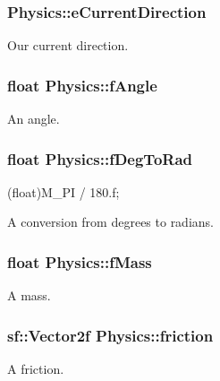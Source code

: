 \subsubsection[{\texorpdfstring{e\+Current\+Direction}{eCurrentDirection}}]{ Physics\+::e\+Current\+Direction}\hypertarget{class_physics_ab58bbe849c871adc33364138e6777971}{}\label{class_physics_ab58bbe849c871adc33364138e6777971}
Our current direction. 
\subsubsection[{\texorpdfstring{f\+Angle}{fAngle}}]{\setlength{\rightskip}{0pt plus 5cm}float Physics\+::f\+Angle\hspace{0.3cm}{\ttfamily [private]}}\hypertarget{class_physics_a80e4f969bbf284b0ace8261527e4b232}{}\label{class_physics_a80e4f969bbf284b0ace8261527e4b232}
An angle. 
\subsubsection[{\texorpdfstring{f\+Deg\+To\+Rad}{fDegToRad}}]{\setlength{\rightskip}{0pt plus 5cm}float Physics\+::f\+Deg\+To\+Rad\hspace{0.3cm}{\ttfamily [private]}}\hypertarget{class_physics_af1307fcecb1d916f395ebcbcae254eb5}{}\label{class_physics_af1307fcecb1d916f395ebcbcae254eb5}


(float)M\+\_\+\+PI / 180.\+f; 

A conversion from degrees to radians. 
\subsubsection[{\texorpdfstring{f\+Mass}{fMass}}]{\setlength{\rightskip}{0pt plus 5cm}float Physics\+::f\+Mass\hspace{0.3cm}{\ttfamily [private]}}\hypertarget{class_physics_ac3484295b9b951d5a44105dd307f6043}{}\label{class_physics_ac3484295b9b951d5a44105dd307f6043}
A mass. 
\subsubsection[{\texorpdfstring{friction}{friction}}]{\setlength{\rightskip}{0pt plus 5cm}sf\+::\+Vector2f Physics\+::friction\hspace{0.3cm}{\ttfamily [private]}}\hypertarget{class_physics_ac40c58642c2fe90699cc49ac96501e2d}{}\label{class_physics_ac40c58642c2fe90699cc49ac96501e2d}
A friction. 
